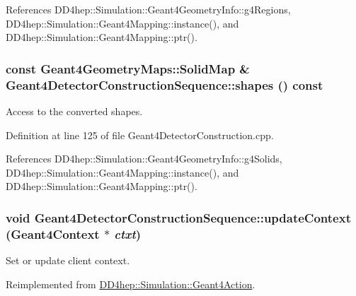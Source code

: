 References DD4hep::Simulation::Geant4GeometryInfo::g4Regions, DD4hep::Simulation::Geant4Mapping::instance(), and DD4hep::Simulation::Geant4Mapping::ptr().\hypertarget{class_d_d4hep_1_1_simulation_1_1_geant4_detector_construction_sequence_a6fd2ab223f31016b42d3cf07d2901da9}{
\subsubsection[{shapes}]{\setlength{\rightskip}{0pt plus 5cm}const {\bf Geant4GeometryMaps::SolidMap} \& Geant4DetectorConstructionSequence::shapes () const}}
\label{class_d_d4hep_1_1_simulation_1_1_geant4_detector_construction_sequence_a6fd2ab223f31016b42d3cf07d2901da9}


Access to the converted shapes. 

Definition at line 125 of file Geant4DetectorConstruction.cpp.

References DD4hep::Simulation::Geant4GeometryInfo::g4Solids, DD4hep::Simulation::Geant4Mapping::instance(), and DD4hep::Simulation::Geant4Mapping::ptr().\hypertarget{class_d_d4hep_1_1_simulation_1_1_geant4_detector_construction_sequence_a2ccfc854d0b38a4b1547422c2779e346}{
\subsubsection[{updateContext}]{\setlength{\rightskip}{0pt plus 5cm}void Geant4DetectorConstructionSequence::updateContext ({\bf Geant4Context} $\ast$ {\em ctxt})}}
\label{class_d_d4hep_1_1_simulation_1_1_geant4_detector_construction_sequence_a2ccfc854d0b38a4b1547422c2779e346}


Set or update client context. 

Reimplemented from \hyperlink{class_d_d4hep_1_1_simulation_1_1_geant4_action_ae3b9daf2af881df956c46568c0743313}{DD4hep::Simulation::Geant4Action}.


